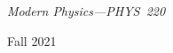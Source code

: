 {\LARGE {\em 
\noindent Modern Physics---PHYS~220
\vspace{0.5mm}

\noindent Fall 2021
\vspace{3mm}
}}

